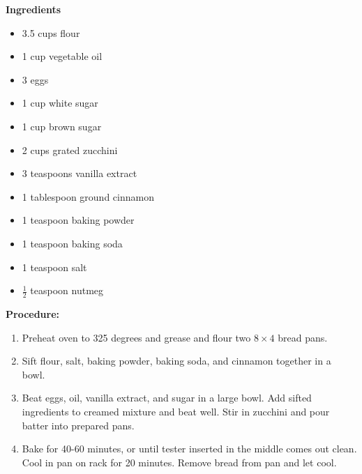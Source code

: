 \begin{multicols}{2}
\textbf{Ingredients}
\begin{itemize}
\item 3.5 cups flour 
\item 1 cup vegetable oil 
\item 3 eggs 
\item 1 cup white sugar
\item 1 cup brown sugar
\item 2 cups grated zucchini
\item 3 teaspoons vanilla extract 
\item 1 tablespoon ground cinnamon
\item 1 teaspoon baking powder
\item 1 teaspoon baking soda 
\item 1 teaspoon salt
\item $\frac{1}{2}$ teaspoon nutmeg



\end{itemize}


\columnbreak
\textbf{Procedure:}
\medskip


\begin{enumerate}
\item Preheat oven to 325 degrees and grease and flour two $8\times4$ bread pans.


\medskip
\item Sift flour, salt, baking powder, baking soda, and cinnamon together in a bowl. 
\medskip

\item Beat eggs, oil, vanilla extract, and sugar in a large bowl. Add sifted ingredients to creamed mixture and beat well. Stir in zucchini and pour batter into prepared pans. 
\newline 

 \item Bake for 40-60 minutes, or until tester inserted in the middle comes out clean. Cool in pan on rack for 20 minutes. Remove bread from pan and let cool.   
\end{enumerate}

\end{multicols}



